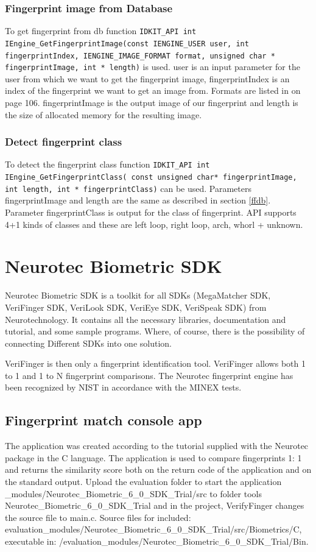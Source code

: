 \label{ffdb}
\subsubsection{Fingerprint image from Database}
To get fingerprint from db function \texttt{IDKIT\_API int IEngine\_GetFingerprintImage(const IENGINE\_USER user, int fingerprintIndex,
IENGINE\_IMAGE\_FORMAT format, unsign\-ed char * fingerprintImage, int * length)} is used. user is an input parameter for the user from which we want to get the fingerprint image, fingerprintIndex is an index of the fingerprint we want to get an image from. Formats are listed in \cite{idkitsdk} on page 106. fingerprintImage is the output image of our fingerprint and length is the size of allocated memory for the resulting image.

\subsubsection{Detect fingerprint class}
To detect the fingerprint class function \texttt{IDKIT\_API int IEngine\_GetFingerprintClass( const unsigned char* fingerprintImage, int
length, int * fingerprintClass)} can be used. Parameters fingerprintImage and length are the same as described in section \ref{ffdb}. Parameter fingerprintClass is output for the class of fingerprint. API supports 4+1 kinds of classes and these are left loop, right loop, arch, whorl + unknown.  

\section{Neurotec Biometric SDK}
Neurotec Biometric SDK is a toolkit for all SDKs (MegaMatcher SDK, VeriFinger SDK, VeriLook SDK, VeriEye SDK, VeriSpeak SDK) from Neurotechnology. It contains all the necessary libraries, documentation and tutorial, and some sample programs. Where, of course, there is the possibility of connecting Different SDKs into one solution. \cite{veri6}

VeriFinger is then only a fingerprint identification tool. VeriFinger allows both 1 to 1 and 1 to N fingerprint comparisons. The Neurotec fingerprint engine has been recognized by NIST in accordance with the MINEX tests. \cite{veri6}

\subsection{Fingerprint match console app}
The application was created according to the tutorial supplied with the Neurotec package in the C language. The application is used to compare fingerprints 1: 1 and returns the similarity score both on the return code of the application and on the standard output. Upload the evaluation folder to start the application \_modules/Neurotec\_Biometric\_6\_0\_SDK\_Tri\-al/src to folder tools Neurotec\_Biometric\_6\_0\_SDK\_Trial and in the project, VerifyFinger changes the source file to main.c. Source files for included: evaluation\_modules/Neuro\-tec\_Biometric\_6\_0\_SDK\_Trial/src/Biometrics/C, executable in: /evaluation\_module\-s/Neurotec\_Biometric\_6\_0\_SDK\_Trial/Bin.

